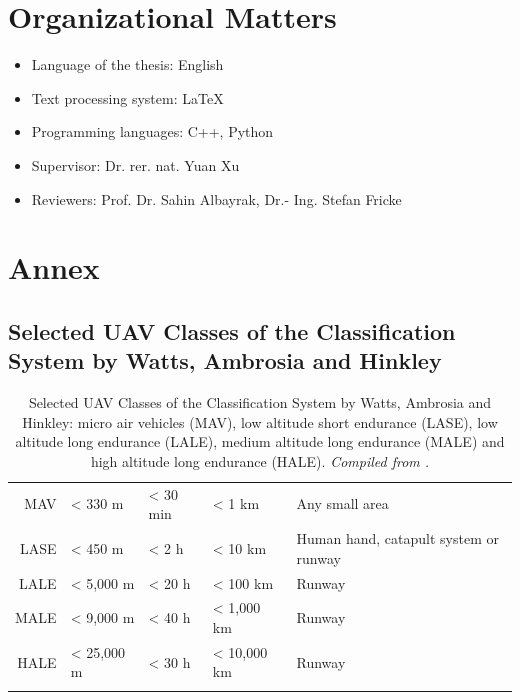 \chapter{Organizational Matters}
\begin{itemize}
	\item Language of the thesis: English
	\item Text processing system: LaTeX
	\item Programming languages: C++, Python
	\item Supervisor: Dr. rer. nat. Yuan Xu
	\item Reviewers: Prof. Dr. Sahin Albayrak, Dr.- Ing. Stefan Fricke
\end{itemize}

\chapter{Annex}


\section{Selected UAV Classes of the Classification System by Watts, Ambrosia and Hinkley}
\begin{table}[H]
    \caption[Selected UAV Classes of the Classification System by Watts, Ambrosia and Hinkley]
	{Selected UAV Classes of the Classification System by Watts, Ambrosia and Hinkley: 
	micro air vehicles (MAV), low altitude short endurance (LASE), 
	low altitude long endurance (LALE), medium altitude long endurance (MALE) and 
	high altitude long endurance (HALE). \textit{Compiled from \cite{Watts2012}.}}
    \label{tab:UAV_classification_system_by_Watts_Ambrosia_and_Hinkley}
    \centering
    \begin{tabular}{r l l l L{0.3\textwidth}}
    \toprule
     &  &  &  &  \\
    \midrule
    MAV     & < 330 m       & < 30 min  & < 1 km        & Any small area \\
    LASE    & < 450 m       & < 2 h     & < 10 km       & Human hand, catapult system or runway \\
    LALE    & < 5,000 m     & < 20 h    & < 100 km      & Runway \\
    MALE    & < 9,000 m     & < 40 h    & < 1,000 km    & Runway \\
    HALE    & < 25,000 m    & < 30 h    & < 10,000 km   & Runway \\
    \bottomrule\\
    \end{tabular}
\end{table}


